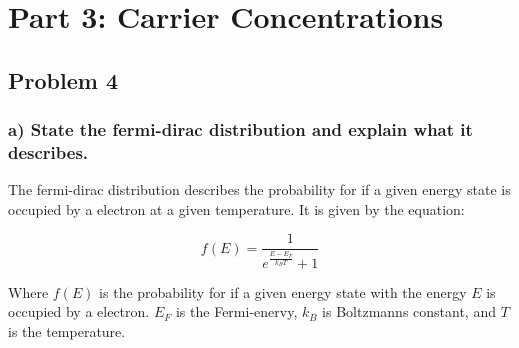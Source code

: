 \section{Part 3: Carrier Concentrations}

\subsection*{Problem 4}

\subsubsection*{a) State the fermi-dirac distribution and explain what it describes.}

The fermi-dirac distribution describes the probability for if a given energy state is occupied by a electron at a given temperature. It is given by the equation:

\begin{equation*}
    f(E)=\frac{1}{e^{\frac{E-E_F}{k_B T}}+1}
\end{equation*}

Where $f(E)$ is the probability for if a given energy state with the energy $E$ is occupied by a electron. $E_F$ is the Fermi-enervy, $k_B$ is Boltzmanns constant, and $T$ is the temperature.

